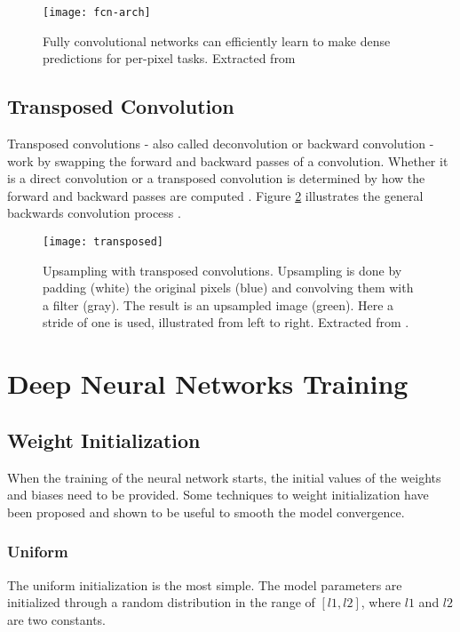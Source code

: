 \begin{figure}[!htb]
\centering
\texttt{[image: fcn-arch]}
\caption{Fully convolutional networks can efficiently learn to make dense predictions for
per-pixel tasks. Extracted from \cite{long2015fully}}
\label{fcn-arch}
\end{figure}

\subsection{Transposed Convolution}

Transposed convolutions - also called deconvolution or backward convolution - work by swapping the forward and backward passes of a convolution. Whether it is a direct convolution or a transposed convolution is determined by how the forward and backward passes are computed \cite{dumoulin2016guide}. Figure \ref{fig:transposed} illustrates the general backwards convolution process \cite{dumoulin2016guide}.

\begin{figure}[!htb]
\centering
\texttt{[image: transposed]}

\caption{Upsampling with transposed convolutions. Upsampling is done by padding
(white) the original pixels (blue) and convolving them with a filter (gray). The result is
an upsampled image (green). Here a stride of one is used, illustrated from left to right. Extracted from \cite{dumoulin2016guide}.} \label{fig:transposed}
\end{figure}

\section{Deep Neural Networks Training}

\subsection{Weight Initialization}
When the training of the neural network starts, the initial values of the weights and biases need to be provided. Some techniques to weight initialization have been proposed and shown to be useful to smooth the model convergence.

\subsubsection{Uniform}
The uniform initialization is the most simple. The model parameters are initialized through a random distribution in the range of $[l1, l2]$, where $l1$ and $l2$ are two constants.

